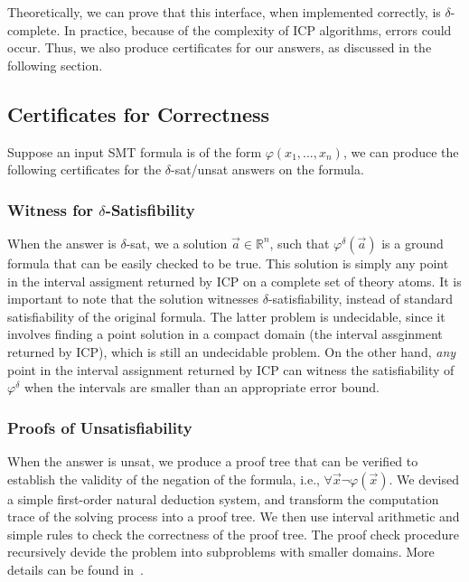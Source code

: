 \documentclass[envcountsect]{llncs}
\begin{document}
Theoretically, we can prove that this interface, when implemented correctly, is
$\delta$-complete. In practice, because of the complexity of ICP algorithms,
errors could occur. Thus, we also produce certificates for our answers, as
discussed in the following section.

\subsection{Certificates for Correctness}

Suppose an input SMT formula is of the form $\varphi(x_1,...,x_n)$, we can
produce the following certificates for the {\sf $\delta$-sat/unsat} answers on
the formula.

\subsubsection{Witness for $\delta$-Satisfibility} When the answer is
{\sf $\delta$-sat}, we a solution $\vec a\in \mathbb{R}^n$, such
that $\varphi^{\delta}(\vec a)$ is a ground formula that can be easily checked
to be true. This solution is simply any point in the interval assigment returned
by ICP on a complete set of theory atoms. It is important to note that the
solution witnesses $\delta$-satisfiability, instead of standard satisfiability
of the original formula. The latter problem is undecidable, since it involves
finding a point solution in a compact domain (the interval assginment returned
by ICP), which is still an undecidable problem. On the other hand, {\em any}
point in the interval assignment returned by ICP can witness the satisfiability
of $\varphi^{\delta}$ when the intervals are smaller than an appropriate error
bound.

\subsubsection{Proofs of Unsatisfiability} When the answer is {\sf unsat}, we
produce a proof tree that can be verified to establish the validity of the
negation of the formula, i.e., $\forall \vec x \neg\varphi(\vec x)$. We
devised a simple first-order natural deduction system, and transform the
computation trace of the solving process into a proof tree. We then use
interval arithmetic and simple rules to check the correctness of the proof
tree. The proof check procedure recursively devide the problem into subproblems
with smaller domains. More details can be found in~\cite{cade2013extended}.
\end{document}
